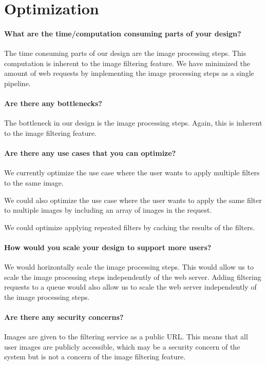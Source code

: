 \documentclass{csse4400}
\begin{document}
\section{Optimization}

\paragraph{What are the time/computation consuming parts of your design?}
The time consuming parts of our design are the image processing steps.
This computation is inherent to the image filtering feature.
We have minimized the amount of web requests by implementing the image processing steps as a single pipeline.

\paragraph{Are there any bottlenecks?}
The bottleneck in our design is the image processing steps.
Again, this is inherent to the image filtering feature.

\paragraph{Are there any use cases that you can optimize?}
We currently optimize the use case where the user wants to apply multiple filters to the same image.

We could also optimize the use case where the user wants to apply the same filter to multiple images by including an array of images in the request.

We could optimize applying repeated filters by caching the results of the filters.

\paragraph{How would you scale your design to support more users?}
We would horizontally scale the image processing steps.
This would allow us to scale the image processing steps independently of the web server.
Adding filtering requests to a queue would also allow us to scale the web server independently of the image processing steps.

\paragraph{Are there any security concerns?}
Images are given to the filtering service as a public URL.
This means that all user images are publicly accessible,
which may be a security concern of the system but is not a concern of the image filtering feature.
\end{document}
